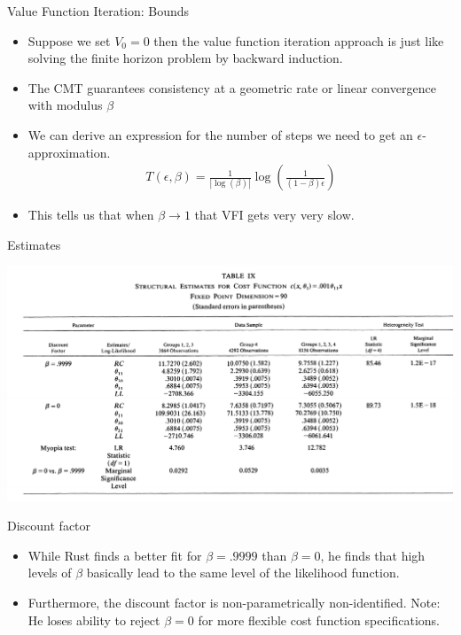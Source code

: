\documentclass[xcolor=pdftex,dvipsnames,table,mathserif,aspectratio=169]{beamer}
\begin{document}
\begin{frame}{Value Function Iteration: Bounds}
\begin{itemize}
\item Suppose we set $V_0 =0$ then the value function iteration approach is just like solving the finite horizon problem by backward induction.
\item The CMT guarantees consistency at a geometric rate or \alert{linear} convergence with modulus $\beta$
\item We can derive an expression for the number of steps we need to get an $\epsilon$-approximation.
\begin{eqnarray*}
T(\epsilon,\beta) = \frac{1}{| \log(\beta) | } \log \left (\frac{1}{(1-\beta)\epsilon} \right)
\end{eqnarray*}
\item This tells us that when $\beta \rightarrow 1$ that VFI gets very very slow.
\end{itemize}
\end{frame}



\begin{frame}{Estimates}
\begin{center}
\hspace*{-.5cm}\includegraphics[scale=.65]{./resources/RustT9.pdf}
\end{center}
\end{frame}

\begin{frame}{Discount factor}
\begin{itemize}
	\item While Rust finds a better fit for $\beta=.9999$ than $\beta=0$, he finds that high levels
	of $\beta$ basically lead to the same level of the likelihood function.

	\medskip
	\item Furthermore, the discount factor is non-parametrically non-identified. Note:
	He loses ability to reject $\beta=0$ for more flexible cost function specifications.

\end{itemize}
\end{frame}
\end{document}
